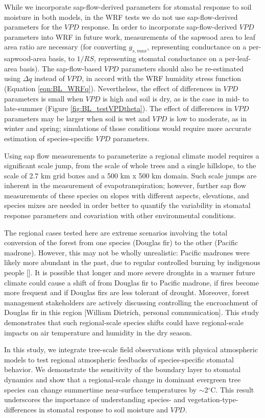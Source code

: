 While we incorporate sap-flow-derived parameters for stomatal response to soil moisture in both models, in the WRF tests we do not use sap-flow-derived parameters for the $VPD$ response.  In order to incorporate sap-flow-derived $VPD$ parameters into WRF in future work, measurements of the sapwood area to leaf area ratio are necessary (for converting $g_{s,max}$, representing conductance on a per-sapwood-area basis, to $1/RS$, representing stomatal conductance on a per-leaf-area basis).  The sap-flow-based $VPD$ parameters should also be re-estimated using $\Delta q$ instead of $VPD$, in accord with the WRF humidity stress function (Equation \ref{eqn:BL_WRFq}).  Nevertheless, the effect of differences in $VPD$ parameters is small when $VPD$ is high and soil is dry, as is the case in mid- to late-summer (Figure \ref{fig:BL_testVPDtheta}).  The effect of differences in $VPD$ parameters may be larger when soil is wet and $VPD$ is low to moderate, as in winter and spring; simulations of those conditions would require more accurate estimation of species-specific $VPD$ parameters.

Using sap flow measurements to parameterize a regional climate model requires a significant scale jump, from the scale of whole trees and a single hillslope, to the scale of 2.7 km grid boxes and a 500 km x 500 km domain.  Such scale jumps are inherent in the measurement of evapotranspiration; however, further sap flow measurements of these species on slopes with different aspects, elevations, and species mixes are needed in order better to quantify the variability in stomatal response parameters and covariation with other environmental conditions.

The regional cases tested here are extreme scenarios involving the total conversion of the forest from one species (Douglas fir) to the other (Pacific madrone).  However, this may not be wholly unrealistic: Pacific madrones were likely more abundant in the past, due to regular controlled burning by indigenous people [\cite{johnsonACRR}].  It is possible that longer and more severe droughts in a warmer future climate could cause a shift of from Douglas fir to Pacific madrone, if fires become more frequent and if Douglas firs are less tolerant of drought.  Moreover, forest management stakeholders are actively discussing controlling the encroachment of Douglas fir in this region [William Dietrich, personal communication]. This study demonstrates that such regional-scale species shifts could have regional-scale impacts on air temperature and humidity in the dry season.

In this study, we integrate tree-scale field observations with physical atmospheric models to test regional atmospheric feedbacks of species-specific stomatal behavior.  We demonstrate the sensitivity of the boundary layer to stomatal dynamics and show that a regional-scale change in dominant evergreen tree species can change summertime near-surface temperatures by $\sim$2$^\circ$C.  This result underscores the importance of understanding species- and vegetation-type-differences in stomatal response to soil moisture and $VPD$.
